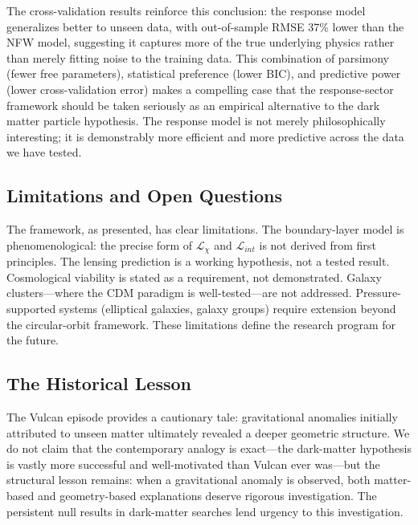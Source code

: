 \documentclass[11pt]{article}
\begin{document}
The cross-validation results reinforce this conclusion: the response model generalizes better to unseen data, with out-of-sample RMSE 37\% lower than the NFW model, suggesting it captures more of the true underlying physics rather than merely fitting noise to the training data. This combination of parsimony (fewer free parameters), statistical preference (lower BIC), and predictive power (lower cross-validation error) makes a compelling case that the response-sector framework should be taken seriously as an empirical alternative to the dark matter particle hypothesis. The response model is not merely philosophically interesting; it is demonstrably more efficient and more predictive across the data we have tested.

\subsection{Limitations and Open Questions}\label{limitations-and-open-questions}

The framework, as presented, has clear limitations. The boundary-layer model is phenomenological: the precise form of \(\mathcal{L}_{\chi}\) and \(\mathcal{L}_{int}\) is not derived from first principles. The lensing prediction is a working hypothesis, not a tested result. Cosmological viability is stated as a requirement, not demonstrated. Galaxy clusters---where the CDM paradigm is well-tested---are not addressed. Pressure-supported systems (elliptical galaxies, galaxy groups) require extension beyond the circular-orbit framework. These limitations define the research program for the future.

\subsection{The Historical Lesson}\label{the-historical-lesson}

The Vulcan episode \citep{LeVerrier1859, Einstein1915, Einstein1916} provides a cautionary tale: gravitational anomalies initially attributed to unseen matter ultimately revealed a deeper geometric structure. We do not claim that the contemporary analogy is exact---the dark-matter hypothesis is vastly more successful and well-motivated than Vulcan ever was---but the structural lesson remains: when a gravitational anomaly is observed, both matter-based and geometry-based explanations deserve rigorous investigation. The persistent null results in dark-matter searches lend urgency to this investigation.
\end{document}
